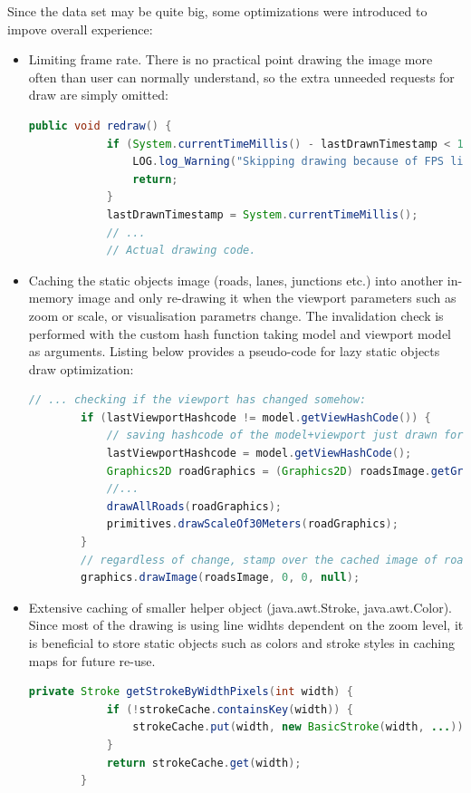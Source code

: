 Since the data set may be quite big, some optimizations were introduced to impove overall experience:
\begin{itemize}
    \item Limiting frame rate. There is no practical point drawing the image more often than user can normally understand, so the extra unneeded requests for draw are simply omitted:
    \begin{lstlisting}[language=java]
        public void redraw() {
            if (System.currentTimeMillis() - lastDrawnTimestamp < 1000 / MAX_FRAME_RATE) {
                LOG.log_Warning("Skipping drawing because of FPS limitation.");
                return;
            }
            lastDrawnTimestamp = System.currentTimeMillis();
            // ...
            // Actual drawing code.
    \end{lstlisting}

    \item Caching the static objects image (roads, lanes, junctions etc.) into another in-memory image and only re-drawing it when the viewport parameters such as zoom or scale, or visualisation parametrs change. The invalidation check is performed with the custom hash function taking model and viewport model as arguments. Listing below provides a pseudo-code for lazy static objects draw optimization:
    \begin{lstlisting}[language=java]
        // ... checking if the viewport has changed somehow:
        if (lastViewportHashcode != model.getViewHashCode()) {
            // saving hashcode of the model+viewport just drawn for future check
            lastViewportHashcode = model.getViewHashCode();
            Graphics2D roadGraphics = (Graphics2D) roadsImage.getGraphics();
            //...
            drawAllRoads(roadGraphics);
            primitives.drawScaleOf30Meters(roadGraphics);
        }
        // regardless of change, stamp over the cached image of roads onto resulting image
        graphics.drawImage(roadsImage, 0, 0, null);
    \end{lstlisting}
    \item Extensive caching of smaller helper object (java.awt.Stroke, java.awt.Color). Since most of the drawing is using line widhts dependent on the zoom level, it is beneficial to store static objects such as colors and stroke styles in caching maps for future re-use.
    \begin{lstlisting}[language=java]
        private Stroke getStrokeByWidthPixels(int width) {
            if (!strokeCache.containsKey(width)) {
                strokeCache.put(width, new BasicStroke(width, ...));
            }
            return strokeCache.get(width);
        }
    \end{lstlisting}


\end{itemize}


